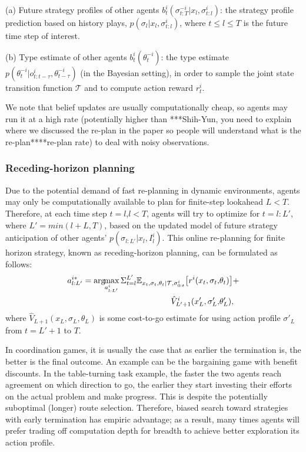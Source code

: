 \documentclass[letterpaper, 10 pt, conference]{ieeeconf}  %
\newcommand{\argmax}{\arg\!\!\max}
\begin{document}
(a) Future strategy profiles of other agents $b^i_t(\sigma^{-i}_{t:T}|x_l,\sigma^i_{t:l})$: 
the strategy profile prediction based on history plays, $p(\sigma_l|x_l,\sigma^i_{t:l})$, 
where $t\leq l\leq T$ is the future time step of 
interest.

(b) Type estimate of other agents $b^i_t(\theta_t^{-i})$: 
the type estimate $p(\theta^{-i}_t|o^i_{t:t-\tau},\theta^{-i}_{t-\tau})$ (in 
the Bayesian setting), in order to sample the joint state transition function 
$\mathcal{T}$ and to compute action reward $r^i_t$.


We note that belief updates are usually computationally cheap, so agents may run it at a high rate (potentially higher than ***Shih-Yun, you need to explain where we discussed the re-plan in the paper so people will understand what is the re-plan****re-plan rate) to deal with noisy 
observations.
 
\subsubsection{Receding-horizon planning}\label{sec:receding}
Due to the potential demand of fast re-planning in dynamic environments, agents may only be computationally available to plan for finite-step lookahead $L<T$. Therefore, at each time step $t=l$,$l<T$, agents will try to optimize for $t=l:L'$, where $L'=min(l+L,T)$, based on the updated model of future strategy anticipation of other agents' $p(\sigma_{l:L'}|x_l,I^i_l)$. This online re-planning 
for finite horizon strategy, known as receding-horizon planning, can be formulated as follows:
\begin{equation}
  \begin{aligned}
  a^{i*}_{l:L'} = \argmax_{a^i_{l:L'}} 
  \Sigma_{t=l}^{L'} 
  \mathbb{E}_{x_t,\sigma_{t},\theta_t|\mathcal{T},\sigma^i_{0:t}} \big{[}
    r^i(x_t,\sigma_t,&\theta_t)\big{]}+ \\
    \hat{V}^i_{L'+1}(x_L',\sigma_L',&\theta_L'), 
  \end{aligned}
  \end{equation}
where $\hat{V}_{L+1}(x_L,\sigma_L,\theta_L)$ is some cost-to-go estimate for using action profile $\sigma'_L$ from $t=L'+1$ to $T$.

In coordination games, it is usually the case that as earlier the termination is, the better is the final outcome. An example can be the bargaining game with benefit discounts. 
In the table-turning task example, the faster the two agents reach 
agreement on which direction to go, the earlier they start investing their efforts on the actual problem and make progress. This is despite the 
potentially suboptimal (longer) route selection. Therefore, biased search toward strategies with early termination has empiric advantage; as a result, many times agents will prefer trading off computation depth for breadth to achieve better exploration its action profile. 
\end{document}
